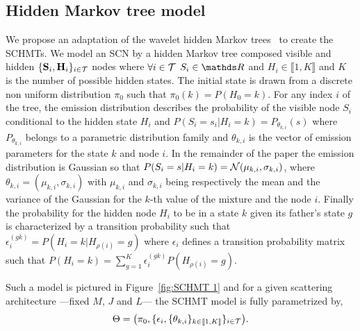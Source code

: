 \documentclass{article}
\begin{document}
  \subsection{Hidden Markov tree model}
    \label{subsec:SCHMT/HMT model}
    We propose an adaptation of the wavelet hidden Markov trees~\citep{Crouse and Durand} to create the SCHMTs. We model an SCN by a hidden Markov tree composed visible and hidden $\{{\bf S}_{i} , {\bf H}_{i}\}_{i \in \mathcal{T}}$ nodes where $\forall i \in \mathcal{T}$ $S_{i} \in \dsR$ and $H_{i} \in \llbracket 1,K \rrbracket$ and $K$ is the number of possible hidden states.
    The initial state is drawn from a discrete non uniform distribution $\pi_{0}$ such that $\pi_{0}(k) = P(H_{0}=k)$.
    For any index $i$ of the tree, the emission distribution describes the probability of the visible node $S_{i}$ conditional to the hidden state $H_{i}$ and $P(S_{i}=s_{i}|H_{i}=k) = P_{\theta_{k,i}}(s)$ where $P_{\theta_{k,i}}$ belongs to a parametric distribution family and $\theta_{k,i}$ is the vector of emission parameters for the state $k$ and node $i$. In the remainder of the paper the emission distribution is Gaussian so that $P(S_{i}=s | H_{i}=k) = \mathcal{N}(\mu_{k,i},\sigma_{k,i})$, where $\theta_{k,i}=(\mu_{k,i},\sigma_{k,i})$ with $\mu_{k,i}$ and $\sigma_{k,i}$ being respectively the mean and the variance of the Gaussian for the $k$-th value of the mixture and the node $i$.
    Finally the probability for the hidden node $H_{i}$ to be in a state $k$ given its father's state $g$ is characterized by a transition probability such that $\epsilon_{i}^{(gk)} = P(H_{i}= k | H_{\rho(i)}=g)$ where $\epsilon_{i}$ defines a transition probability matrix such that $P(H_{i}=k) = \sum_{g=1}^{K} \epsilon_{i}^{(gk)} P(H_{\rho(i)}=g)$.

    Such a model is pictured in Figure~\ref{fig:SCHMT 1} and for a given scattering architecture ---\ie fixed $M$, $J$ and $L$--- the SCHMT model is fully parametrized by,
    \vspace{-5pt}
    \begin{equation}
      \Theta = \big(\pi_{0}, \{ \epsilon_{i}, \{ \theta_{k,i} \}_{k\in\llbracket1,K\rrbracket} \}_{i\in\mathcal{T}}\big).
      \label{eq:SCHMT - parameters}
    \end{equation}
    \vspace{-15pt}
\end{document}
